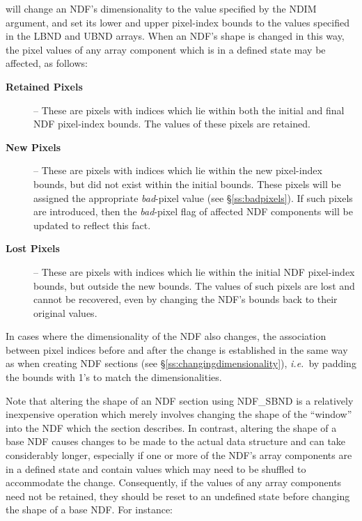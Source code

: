 \documentclass[twoside,11pt]{article}
\newcommand{\st}[1]{{\em{#1}}}
\begin{document}
will change an NDF's dimensionality to the value specified by the NDIM
argument, and set its lower and upper pixel-index bounds to the values
specified in the LBND and UBND arrays. 
When an NDF's shape is changed in this way, the pixel values of any array
component which is in a defined state may be affected, as follows: 

\begin{description}

\item[{\bf Retained Pixels}] -- These are pixels with indices which lie
within both the initial and final NDF pixel-index bounds. 
The values of these pixels are retained.

\item[{\bf New Pixels}] -- These are pixels with indices which lie within
the new pixel-index bounds, but did not exist within the initial bounds. 
These pixels will be assigned the appropriate \st{bad\/}-pixel value (see 
\S\ref{ss:badpixels}).
If such pixels are introduced, then the \st{bad\/}-pixel flag of affected NDF 
components will be updated to reflect this fact.

\item[{\bf Lost Pixels}] -- These are pixels with indices which lie within
the initial NDF pixel-index bounds, but outside the new bounds. 
The values of such pixels are lost and cannot be recovered, even by changing
the NDF's bounds back to their original values. 

\end{description}

In cases where the dimensionality of the NDF also changes, the association
between pixel indices before and after the change is established in the same
way as when creating NDF sections (see \S\ref{ss:changingdimensionality}),
\st{i.e.}\ by padding the bounds with 1's to match the dimensionalities. 

Note that altering the shape of an NDF section using NDF\_SBND is a
relatively inexpensive operation which merely involves changing the shape of
the ``window'' into the NDF which the section describes. 
In contrast, altering the shape of a base NDF causes changes to be made to
the actual data structure and can take considerably longer, especially if one
or more of the NDF's array components are in a defined state and contain
values which may need to be shuffled to accommodate the change. 
Consequently, if the values of any array components need not be retained,
they should be reset to an undefined state before changing the shape of a
base NDF. 
For instance:
\end{document}

